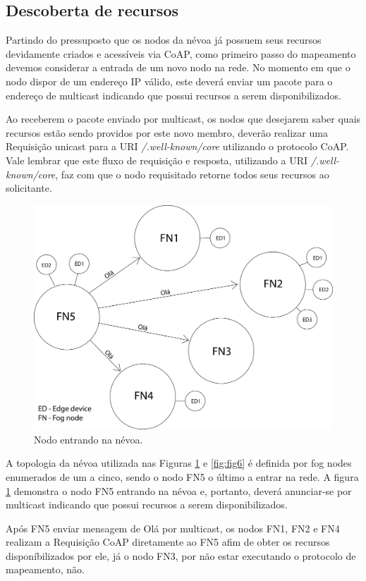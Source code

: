 \subsection{Descoberta de recursos}


Partindo do pressuposto que os nodos da névoa já possuem seus recursos devidamente criados e acessíveis via CoAP,
como primeiro passo do mapeamento devemos considerar a entrada de um novo nodo na rede.
No momento em que o nodo dispor de um endereço IP válido, este deverá enviar um pacote para o endereço de multicast indicando que possui recursos a serem disponibilizados.


Ao receberem o pacote enviado por multicast, os nodos que desejarem saber quais recursos estão sendo providos por este novo membro, deverão realizar uma Requisição
unicast para a URI \textit{/.well-known/core} utilizando o protocolo CoAP.
Vale lembrar que este fluxo de requisição e resposta, utilizando a URI \textit{/.well-known/core}, faz com que o nodo requisitado retorne todos seus recursos ao solicitante.

\begin{figure}[H]
    \centering\includegraphics[width=.8\textwidth]{fig5.png}
    \caption%
    {\label{fig:fig5} Nodo entrando na névoa.}
\end{figure}

A topologia da névoa utilizada nas Figuras \ref{fig:fig5} e \ref{fig:fig6} é definida por fog nodes enumerados de um a cinco, sendo o nodo FN5 o último a entrar na rede.
A figura \ref{fig:fig5} demonstra o nodo FN5 entrando na névoa e, portanto, deverá anunciar-se por multicast indicando que possui recursos a serem disponibilizados.

Após FN5 enviar mensagem de Olá por multicast, os nodos FN1, FN2 e FN4 realizam a Requisição CoAP diretamente ao FN5 afim de obter os recursos disponíbilizados por ele,
já o nodo FN3, por não estar executando o protocolo de mapeamento, não.

